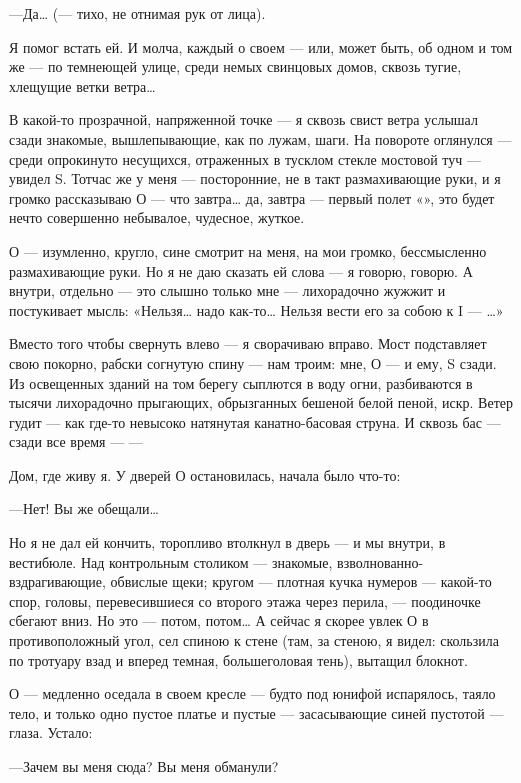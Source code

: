 \documentclass[11pt,openany]{book}
\begin{document}
---Да\ldots{} (--- тихо, не отнимая рук от лица).

Я помог встать ей. И молча, каждый о своем --- или, может быть, об одном и том же --- по темнеющей улице, среди немых свинцовых домов, сквозь тугие, хлещущие ветки ветра\ldots{}

В какой-то прозрачной, напряженной точке --- я сквозь свист ветра услышал сзади знакомые, вышлепывающие, как по лужам, шаги. На повороте оглянулся --- среди опрокинуто несущихся, отраженных в тусклом стекле мостовой туч --- увидел S. Тотчас же у меня --- посторонние, не в такт размахивающие руки, и я громко рассказываю О --- что завтра\ldots{} да, завтра --- первый полет «», это будет нечто совершенно небывалое, чудесное, жуткое.

О --- изумленно, кругло, сине смотрит на меня, на мои громко, бессмысленно размахивающие руки. Но я не даю сказать ей слова --- я говорю, говорю. А внутри, отдельно --- это слышно только мне --- лихорадочно жужжит и постукивает мысль: «Нельзя\ldots{} надо как-то\ldots{} Нельзя вести его за собою к I --- \ldots{}»

Вместо того чтобы свернуть влево --- я сворачиваю вправо. Мост подставляет свою покорно, рабски согнутую спину --- нам троим: мне, О --- и ему, S сзади. Из освещенных зданий на том берегу сыплются в воду огни, разбиваются в тысячи лихорадочно прыгающих, обрызганных бешеной белой пеной, искр. Ветер гудит --- как где-то невысоко натянутая канатно-басовая струна. И сквозь бас --- сзади все время --- ---

Дом, где живу я. У дверей О остановилась, начала было что-то:

---Нет! Вы же обещали\ldots{}

Но я не дал ей кончить, торопливо втолкнул в дверь --- и мы внутри, в вестибюле. Над контрольным столиком --- знакомые, взволнованно-вздрагивающие, обвислые щеки; кругом --- плотная кучка нумеров --- какой-то спор, головы, перевесившиеся со второго этажа через перила, --- поодиночке сбегают вниз. Но это --- потом, потом\ldots{} А сейчас я скорее увлек О в противоположный угол, сел спиною к стене (там, за стеною, я видел: скользила по тротуару взад и вперед темная, большеголовая тень), вытащил блокнот.

О --- медленно оседала в своем кресле --- будто под юнифой испарялось, таяло тело, и только одно пустое платье и пустые --- засасывающие синей пустотой --- глаза. Устало:

---Зачем вы меня сюда? Вы меня обманули?
\end{document}
